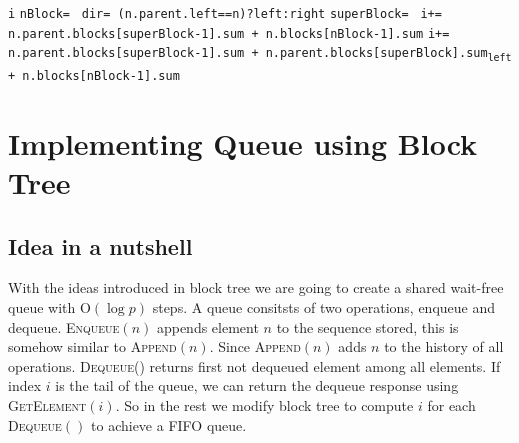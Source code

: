 \documentclass[10pt]{article}
\newcommand\keywordfont{\sffamily\bfseries}
\theoremstyle{definition}
\begin{document}
\begin{algorithm}
\begin{algorithmic}[1]
 
\If{\texttt{n {\keywordfont is} root}} \Return \texttt{i}
\Else
\State \texttt{nBlock= }
\State \texttt{dir= (n.parent.left==n)?left:right}
\State \texttt{superBlock= }
\If{\texttt{dir {\keywordfont is} left}}
\State \texttt{i+= n.parent.blocks[superBlock-1].sum + n.blocks[nBlock-1].sum}
\Else \State \texttt{i+= n.parent.blocks[superBlock-1].sum + n.parent.blocks[superBlock].sum\textsubscript{left} + n.blocks[nBlock-1].sum}
\EndIf
\State \Return{}
\EndIf
{}

\Statex

%
%

\end{algorithmic}
\end{algorithm}

\section{Implementing Queue using Block Tree}
\subsection{Idea in a nutshell}
With the ideas introduced in block tree we are going to create a shared wait-free queue with \textsc{O}$(\log p)$ steps. A queue consitsts of two operations, enqueue and dequeue. \textsc{Enqueue}$(n)$ appends element $n$ to the sequence stored, this is somehow similar to \textsc{Append}$(n)$. Since \textsc{Append}$(n)$  adds $n$ to the history of all operations. \textsc{Dequeue()} returns first not dequeued element among all elements. If index $i$ is the tail of the queue, we can return the dequeue response using \textsc{GetElement}$(i)$.  So in the rest we modify block tree to compute $i$ for each \textsc{Dequeue}$()$ to achieve a FIFO queue.
\end{document}
